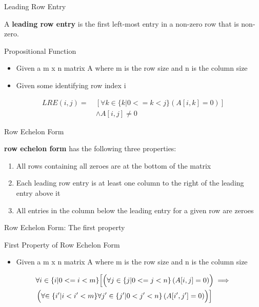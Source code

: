 \documentclass{beamer}
\begin{document}
\begin{frame}{Leading Row Entry}
  \begin{definition}
    A \textbf{leading row entry} is the first left-most entry in a non-zero row that is non-zero.
  \end{definition}
  \begin{block}{Propositional Function}
    \begin{itemize}
      \item Given a m x n matrix A where m is the row size and n is the column size
      \item Given some identifying row index i
    \end{itemize}
    \begin{equation}
      \begin{split}
        LRE(i, j) = \ &\left[\forall k \in \{ k | 0 <= k < j \}\left(A\left[i, k\right] = 0\right)\right] \\
                    \ &\land A\left[i, j\right] \neq 0
      \end{split}
    \end{equation}
  \end{block}
\end{frame}

\begin{frame}{Row Echelon Form}
  \begin{definition}
    \textbf{row echelon form} has the following three properties:
    \begin{enumerate}
      \item All rows containing all zeroes are at the bottom of the matrix
      \item Each leading row entry is at least one column to the right of the leading entry above it
      \item All entries in the column below the leading entry for a given row are zeroes
    \end{enumerate}
  \end{definition}
\end{frame}


\begin{frame}{Row Echelon Form: The first property}
  \begin{block}{First Property of Row Echelon Form}
    \begin{itemize}
    \item Given a m x n matrix A where m is the row size and n is the column size
    \end{itemize}
    \begin{equation}
      \begin{split}
        &\forall i \in \{i | 0 <= i < m\}\Bigl[\Bigl(\forall j \in \{j | 0 <= j < n \}\left( A[i, j] = 0\right)\Bigr) \implies \Bigr. \\ 
        &\left(\forall \Bigl. \in \{i^{\prime} | i < i^{\prime} < m\} \forall j^{\prime} \in \{ j^{\prime} | 0 < j^{\prime} < n \} \left(A[i^{\prime}, j^{\prime}] = 0\right) \right) \Bigr]
      \end{split}
    \end{equation}
  \end{block}
\end{frame}
\end{document}

